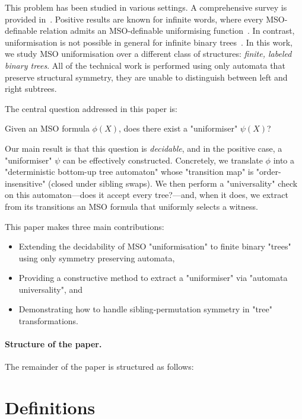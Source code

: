 \documentclass[a4paper,UKenglish,cleveref, autoref, thm-restate]{lipics-v2021}
\begin{document}
This problem has been studied in various settings. A comprehensive survey is provided in~\cite{Cara15}. Positive results are known for infinite words, where every MSO-definable
relation admits an MSO-definable uniformising function~\cite{Siefkes1975, Choffrut1999, Rabin07}. In contrast, uniformisation is not possible in general for infinite binary
trees~\cite{GS83}.
In this work, we study MSO uniformisation over a different class of structures: \emph{finite, labeled binary trees}.
All of the technical work is performed using only automata that preserve structural symmetry,
\ie they are unable to distinguish between left and right subtrees.

The central question addressed in this paper is:

\begin{problem}\label{prob:uniformisation-problem}
\AP Given an MSO formula $\phi(X)$, does there exist a "uniformiser" $\psi(X)$?
\end{problem}

Our main result is that this question is \emph{decidable}, and in the positive case, a "uniformiser" $\psi$ can be effectively constructed. Concretely, we translate $\phi$ into a
"deterministic bottom-up tree automaton" whose "transition map" is "order-insensitive" (\ie closed under sibling swaps). We then perform a "universality" check on this
automaton—does it accept every tree?—and, when it does, we extract from its transitions an MSO formula that uniformly selects a witness.

This paper makes three main contributions:
\begin{itemize}
	\item Extending the decidability of MSO "uniformisation" to finite binary "trees" using only symmetry preserving automata,
	\item Providing a constructive method to extract a "uniformiser" via "automata universality", and
	\item Demonstrating how to handle sibling‐permutation symmetry in "tree" transformations.
\end{itemize}


\paragraph*{Structure of the paper.} The remainder of the paper is structured as follows:

\section{Definitions}
\label{sec:definitions}
\end{document}
